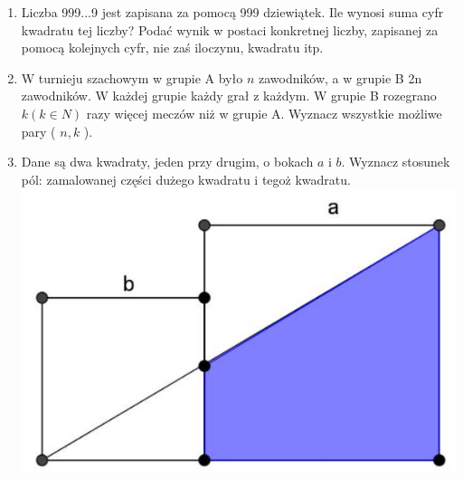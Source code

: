 \documentclass[10pt]{article}
\begin{document}
\begin{enumerate}
  \item Liczba 999...9 jest zapisana za pomocą 999 dziewiątek. Ile wynosi suma cyfr kwadratu tej liczby? Podać wynik w postaci konkretnej liczby, zapisanej za pomocą kolejnych cyfr, nie zaś iloczynu, kwadratu itp.
  \item W turnieju szachowym w grupie A było \(n\) zawodników, a w grupie B 2n zawodników. W każdej grupie każdy grał z każdym. W grupie B rozegrano \(k(k \in N)\) razy więcej meczów niż w grupie A. Wyznacz wszystkie możliwe pary ( \(n, k\) ).
  \item Dane są dwa kwadraty, jeden przy drugim, o bokach \(a\) i \(b\). Wyznacz stosunek pól: zamalowanej części dużego kwadratu i tegoż kwadratu.\\
\includegraphics[max width=\textwidth, center]{2024_11_21_cc19a29450c490975967g-1}
\end{enumerate}
\end{document}

